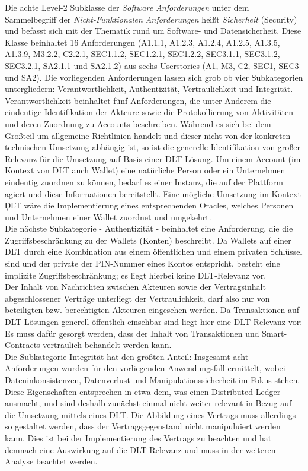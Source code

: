 Die achte Level-2 Subklasse der \textit{Software Anforderungen} unter dem Sammelbegriff der \textit{Nicht-Funktionalen Anforderungen} heißt \textit{Sicherheit} (Security) und befasst sich mit der Thematik rund um Software- und Datensicherheit. Diese Klasse beinhaltet 16 Anforderungen (A1.1.1, A1.2.3, A1.2.4, A1.2.5, A1.3.5, A1.3.9, M3.2.2, C2.2.1, SEC1.1.2, SEC1.2.1, SEC1.2.2, SEC3.1.1, SEC3.1.2, SEC3.2.1, SA2.1.1 und SA2.1.2) aus sechs Userstories (A1, M3, C2, SEC1, SEC3 und SA2). Die vorliegenden Anforderungen lassen sich grob ob vier Subkategorien untergliedern: Verantwortlichkeit, Authentizität, Vertraulichkeit und Integrität. Verantwortlichkeit beinhaltet fünf Anforderungen, die unter Anderem die eindeutige Identifikation der Akteure sowie die Protokollierung von Aktivitäten und deren Zuordnung zu Accounts beschreiben. Während es sich bei dem Großteil um allgemeine Richtlinien handelt und dieser nicht von der konkreten technischen Umsetzung abhängig ist, so ist die generelle Identifikation von großer Relevanz für die Umsetzung auf Basis einer \ac{DLT}-Lösung. Um einem Account (im Kontext von \ac{DLT} auch Wallet) eine natürliche Person oder ein Unternehmen eindeutig zuordnen zu können, bedarf es einer Instanz, die auf der Plattform agiert und diese Informationen bereitstellt. Eine mögliche Umsetzung im Kontext \c{DLT} wäre die Implementierung eines entsprechenden Oracles, welches Personen und Unternehmen einer Wallet zuordnet und umgekehrt.\\
Die nächste Subkategorie - Authentizität - beinhaltet eine Anforderung, die die Zugriffsbeschränkung zu der Wallets (Konten) beschreibt. Da Wallets auf einer \ac{DLT} durch eine Kombination aus einem öffentlichen und einem privaten Schlüssel sind und der private der PIN-Nummer eines Kontos entspricht, besteht eine implizite Zugriffsbeschränkung; es liegt hierbei keine \ac{DLT}-Relevanz vor.\\
Der Inhalt von Nachrichten zwischen Akteuren sowie der Vertragsinhalt abgeschlossener Verträge unterliegt der Vertraulichkeit, darf also nur von beteiligten bzw. berechtigten Akteuren eingesehen werden. Da Transaktionen auf \ac{DLT}-Lösungen generell öffentlich einsehbar sind liegt hier eine \ac{DLT}-Relevanz vor: Es muss dafür gesorgt werden, dass der Inhalt von Transaktionen und Smart-Contracts vertraulich behandelt werden kann.\\
Die Subkategorie Integrität hat den größten Anteil: Insgesamt acht Anforderungen wurden für den vorliegenden Anwendungsfall ermittelt, wobei Dateninkonsistenzen, Datenverlust und Manipulationssicherheit im Fokus stehen. Diese Eigenschaften entsprechen in etwa dem, was einen Distributed Ledger ausmacht, und sind deshalb zunächst einmal nicht weiter relevant in Bezug auf die Umsetzung mittels eines \ac{DLT}. Die Abbildung eines Vertrags muss allerdings so gestaltet werden, dass der Vertragsgegenstand nicht manipuluiert werden kann. Dies ist bei der Implementierung des Vertrags zu beachten und hat demnach eine Auswirkung auf die \ac{DLT}-Relevanz und muss in der weiteren Analyse beachtet werden.


